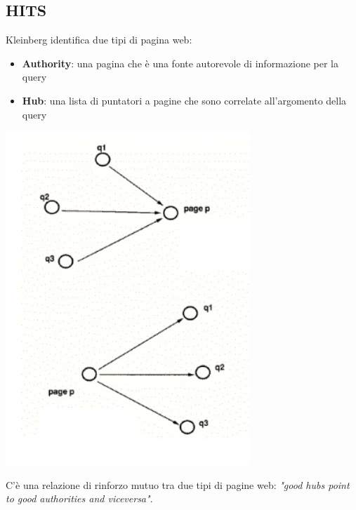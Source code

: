 \subsection{HITS}
Kleinberg identifica due tipi di pagina web:
\begin{multicols}{2}
\begin{itemize}
    \item \textbf{Authority}: una pagina che è una fonte autorevole di informazione per la query
    \item \textbf{Hub}: una lista di puntatori a pagine che sono correlate all'argomento della query
\end{itemize}
\begin{center}
    \includegraphics[scale=0.4]{Images/TecnologieWeb/7/HITS.jpg}
\end{center}
\end{multicols}
C'è una relazione di rinforzo mutuo tra due tipi di pagine web: \emph{"good hubs point to good authorities and viceversa"}.\\

